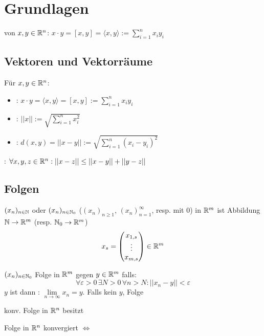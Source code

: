 \section{Grundlagen}

\Def {} von $x, y \in \mathbb{R}^n$:
$x \cdot y = [x, y] = \langle x, y \rangle := \sum_{i=1}^n x_i y_i$

\subsection{Vektoren und Vektorräume}

\Def Für $x, y \in \mathbb{R}^n$:
\vspace{-0.6em}
\begin{itemize}
    \item {}: $x \cdot y = \langle x,y \rangle = [x,y] := \sum_{i=1}^{n}x_i y_i$
    \item {}: $||x|| := \sqrt{\sum_{i=1}^{n}x_i^2}$
    \item {}: $d(x,y) = ||x-y|| := \sqrt{\sum_{i=1}^{n}(x_i-y_i)^2}$
\end{itemize}

\Satz {}: $\forall x,y,z \in \mathbb{R}^n : ||x-z||\le ||x-y|| + ||y - z||$

\subsection{Folgen}

\Def {} $(x_n)_{n \in \mathbb{N}}$ oder $(x_n)_{n \in \mathbb{N}_0}$
($(x_n)_{n \ge 1}$, $(x_n)_{n=1}^\infty$, resp. mit $0$) in $\mathbb{R}^m$
ist Abbildung $\mathbb{N} \to \mathbb{R}^m$ (resp. $\mathbb{N}_0 \to \mathbb{R}^m$)
$$x_s = \begin{pmatrix}
    x_{1,s} \\
    \vdots \\
    x_{m,s} \\
\end{pmatrix} \in \mathbb{R}^m$$

\Def $(x_n)_{n \in \mathbb{N}_0}$ Folge in $\mathbb{R}^m$  gegen $y \in \mathbb{R}^m$ falls:
$$\forall \varepsilon > 0 \, \exists N > 0 \, \forall n > N : || x_n - y || < \varepsilon$$
$y$ ist dann : $\lim\limits_{n \to \infty} x_n = y$.
Falls kein $y$, Folge 

\Satz konv. Folge in $\mathbb{R}^n$ besitzt 

\Satz Folge in $\mathbb{R}^n$ konvergiert $\iff$ 

